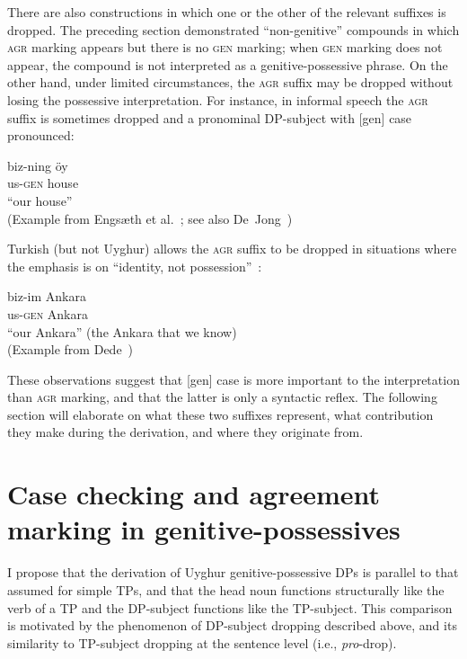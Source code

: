 \documentclass[letterpaper,12pt]{article}
\newcommand{\posst}{\textsc{agr}}
\newcommand{\gen}{\textsc{gen}}
\begin{document}
There are also constructions in which one or the other of the relevant suffixes is dropped. The preceding section
demonstrated ``non-genitive'' compounds in which \posst{} marking appears but there is no \gen{} marking; when \gen{} marking does not appear, the compound is not interpreted as a genitive-possessive phrase. On the other hand, under limited
circumstances, the \posst{} suffix may be dropped without losing the possessive interpretation. For instance, in informal speech the \posst{} suffix is sometimes dropped and a pronominal DP-subject with [gen] case pronounced:
\begin{exe}
\ex \gll biz-ning \"oy\\
				 us-\gen{} house\\
	  \glt ``our house''\\
	       (Example from Engs\ae{}th et al.~\citeyear[p. 117]{Engetal}; see also De~Jong~\citeyear[p. 39]{deJong})
\end{exe}
Turkish (but not Uyghur) allows the \posst{} suffix to be dropped in situations where the emphasis is on ``identity, not possession''~\cite[p. 26]{Dede}:
\begin{exe}
\ex \gll biz-im Ankara\\
				 us-\gen{} Ankara\\
				 ``our Ankara'' (the Ankara that we know)\\
				 (Example from Dede~\citeyear[p. 27]{Dede})
\end{exe}
These observations suggest that [gen] case is more important to the interpretation than \posst{} marking, and that the latter is
only a syntactic reflex. The following section will elaborate on what these two suffixes represent, what contribution they make
during the derivation, and where they originate from.

\section{Case checking and agreement marking in genitive-possessives}
I propose that the derivation of Uyghur genitive-possessive DPs is parallel to that assumed for simple TPs, and that the head noun functions structurally like the verb of
a TP and the DP-subject functions like the TP-subject. This comparison is motivated by the phenomenon of DP-subject dropping described above, and its similarity to
TP-subject dropping at the sentence level (i.e., \textit{pro}-drop).
\end{document}
